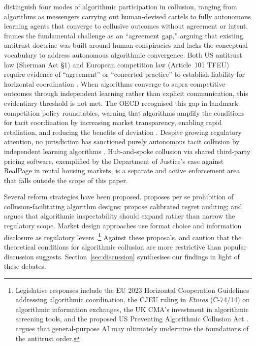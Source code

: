 \citet{EzrachiStucke2017} distinguish four modes of algorithmic participation in collusion, ranging from algorithms as messengers carrying out human-devised cartels to fully autonomous learning agents that converge to collusive outcomes without agreement or intent. \citet{Mehra2016} frames the fundamental challenge as an ``agreement gap,'' arguing that existing antitrust doctrine was built around human conspiracies and lacks the conceptual vocabulary to address autonomous algorithmic convergence. Both US antitrust law (Sherman Act \S1) and European competition law (Article~101 TFEU) require evidence of ``agreement'' or ``concerted practice'' to establish liability for horizontal coordination \citep{Harrington2018, Gal2019}. When algorithms converge to supra-competitive outcomes through independent learning rather than explicit communication, this evidentiary threshold is not met. The OECD recognised this gap in landmark competition policy roundtables, warning that algorithms amplify the conditions for tacit coordination by increasing market transparency, enabling rapid retaliation, and reducing the benefits of deviation \citep{OECD2017, OECD2023}. Despite growing regulatory attention, no jurisdiction has sanctioned purely autonomous tacit collusion by independent learning algorithms \citep{OECD2023, Harrington2018}. Hub-and-spoke collusion via shared third-party pricing software, exemplified by the Department of Justice's case against RealPage in rental housing markets, is a separate and active enforcement area \citep{EzrachiStucke2024} that falls outside the scope of this paper.

Several reform strategies have been proposed. \citet{Harrington2018} proposes per se prohibition of collusion-facilitating algorithm designs; \citet{Hartline2024, Hartline2025} propose calibrated regret auditing; and \citet{Gal2019} argues that algorithmic inspectability should expand rather than narrow the regulatory scope. Market design approaches use format choice and information disclosure as regulatory levers \citep{BanchioSkrzypacz2022, Zhang2025Noise}.\footnote{Legislative responses include the EU 2023 Horizontal Cooperation Guidelines addressing algorithmic coordination, the CJEU ruling in \emph{Eturas} (C-74/14) on algorithmic information exchanges, the UK CMA's investment in algorithmic screening tools, and the proposed US Preventing Algorithmic Collusion Act \citep{OECD2023}. \citet{Crane2024} argues that general-purpose AI may ultimately undermine the foundations of the antitrust order.} Against these proposals, \citet{Petit2017} and \citet{Schwalbe2018} caution that the theoretical conditions for algorithmic collusion are more restrictive than popular discussion suggests. Section~\ref{sec:discussion} synthesises our findings in light of these debates.

